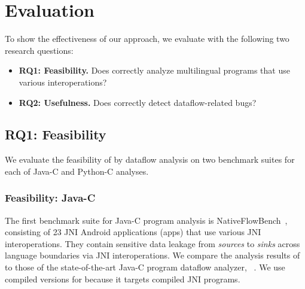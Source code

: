 \newcommand{\req}[1]{RQ#1}

\section{Evaluation}\label{sec:eval}



To show the effectiveness of our approach, we evaluate
\ours with the following two research questions:
\begin{itemize}
  \item \textbf{\req{1}: Feasibility.} Does \ours correctly analyze multilingual
    programs that use various interoperations?

  \item \textbf{\req{2}: Usefulness.} Does \ours correctly detect dataflow-related
    bugs?
\end{itemize}

\subsection{\req{1}: Feasibility}
We evaluate the feasibility of \ours by dataflow analysis on
two benchmark suites for each of Java-C and Python-C analyses.

\subsubsection{Feasibility: Java-C}
The first benchmark suite for Java-C program analysis is NativeFlowBench~\cite{nativeflowbench, JN-SAF},
consisting of 23 JNI Android applications (apps) that use various JNI interoperations.
They contain sensitive data leakage from {\it sources} to {\it sinks}
across language boundaries via JNI interoperations.
We compare the analysis results of \ours to those of the state-of-the-art Java-C program
dataflow analyzer, \jnsaf~\cite{JN-SAF}. We use
compiled versions for \jnsaf because it targets compiled JNI programs.

